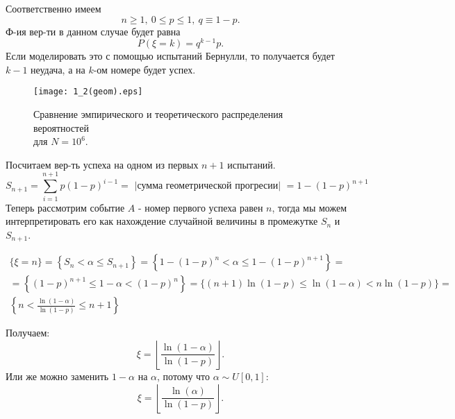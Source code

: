 \documentclass[11pt]{article}
\begin{document}
Соответственно имеем
$$
 n \geqslant 1,~ 0 \leqslant p \leqslant 1,~ q \equiv 1 -p.
$$
Ф-ия вер-ти в данном случае будет равна
$$
    P(\xi = k) = q^{k-1}p.
$$
Если моделировать это с помощью испытаний Бернулли, то получается будет $k-1$ неудача, а на $k$-ом номере будет успех. \

\begin{figure}[ht]

    \texttt{[image: 1\_2(geom).eps]} 
    \caption{Сравнение эмпирического и теоретического распределения вероятностей \\ 
    для $N=10^6$.}
\end{figure}  

Посчитаем вер-ть успеха на одном из первых $n+1$ испытаний. 
$$
    S_{n+1} = \sum_{i=1}^{n+1} p (1-p)^{i-1} = \text{ |сумма геометрической прогресии| }= 1 - (1-p)^{n+1}
$$
Теперь рассмотрим событие $A$ - номер первого успеха равен $n$, тогда мы можем интерпретировать его как нахождение случайной величины в промежутке $S_n$ и $S_{n+1}$.

$$
\begin{gathered}
\{\xi=n\}=
\left\{S_n < \alpha \leq S_{n+1}\right\}=
\left\{1-(1-p)^n < \alpha \leq 1-(1-p)^{n + 1}\right\}= \\
=\left\{(1-p)^{n+1} \leq 1-\alpha<(1-p)^n\right\}=\{(n+1) \ln (1-p) \leq \ln (1-\alpha)<n \ln (1-p)\}= \\ 
\left\{n<\frac{\ln (1-\alpha)}{\ln (1-p)} \leq n+1\right\}
\end{gathered}
$$

Получаем:
$$
\xi=\left\lfloor \frac{\ln (1 - \alpha)}{\ln (1-p)}\right\rfloor.
$$
Или же можно заменить $1 - \alpha$ на $\alpha$, потому что $\alpha \sim U[0,1]$:
$$
\xi=\left\lfloor \frac{\ln (\alpha)}{\ln (1-p)}\right\rfloor.
$$
\end{document}
